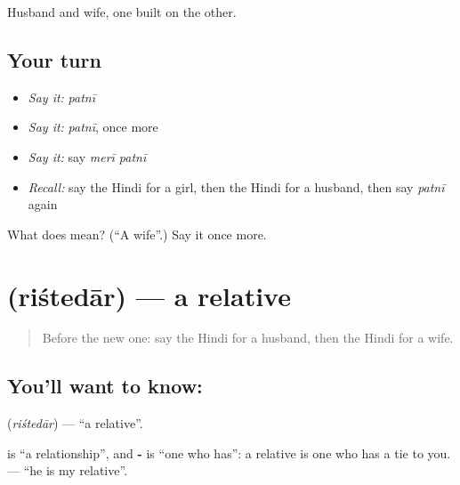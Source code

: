 \begin{grammarlens}[title={What you've built}]
Husband and wife, one built on the other.
\end{grammarlens}

\subsection*{Your turn}
\begin{itemize}
\raggedright
  \item \emph{Say it:} \emph{patnī}
  \item \emph{Say it:} \emph{patnī}, once more
  \item \emph{Say it:} say \emph{merī patnī}
  \item \emph{Recall:} say the Hindi for a girl, then the Hindi for a husband, then say \emph{patnī} again
\end{itemize}

\begin{tcolorbox}[breakable,colback=teal!4,colframe=teal!35!black,title={Before you move on}]
What does  mean? (\textquotedblleft{}A wife\textquotedblright{}.) Say it once more.
\end{tcolorbox}
\section[\texorpdfstring{\hi{रिश्तेदार} (riśtedār)}{रिश्तेदार (riśtedār)}]{ (riśtedār) — a relative}

\label{lesson:HI-C118-rishtedar}



\begin{quote}
Before the new one: say the Hindi for a husband, then the Hindi for a wife.
\end{quote}

\subsection*{You'll want to know: }
\textbf{} (\emph{riśtedār}) — \textquotedblleft{}a relative\textquotedblright{}.

\textbf{} is \textquotedblleft{}a relationship\textquotedblright{}, and \textbf{-} is \textquotedblleft{}one who has\textquotedblright{}: a relative is one who has a tie to you. \textbf{   } — \textquotedblleft{}he is my relative\textquotedblright{}.

